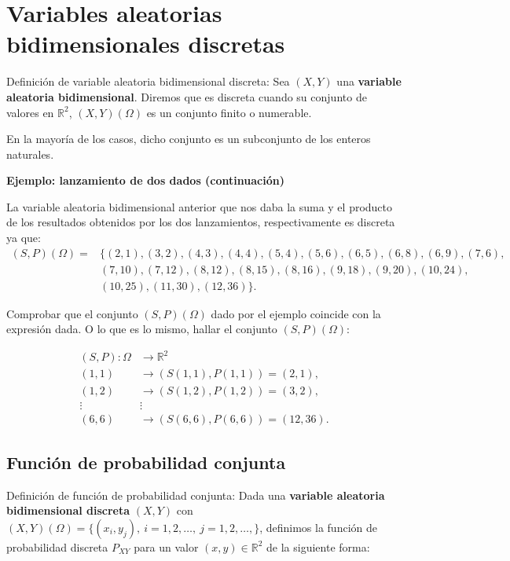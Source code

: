 \documentclass[
  letterpaper,
  DIV=11,
  numbers=noendperiod]{scrreprt}
\begin{document}
\hypertarget{variables-aleatorias-bidimensionales-discretas}{%
\section{Variables aleatorias bidimensionales
discretas}\label{variables-aleatorias-bidimensionales-discretas}}

Definición de variable aleatoria bidimensional discreta: Sea \((X,Y)\)
una \textbf{variable aleatoria bidimensional}. Diremos que es discreta
cuando su conjunto de valores en \(\mathbb{R}^2\), \((X,Y)(\Omega)\) es
un conjunto finito o numerable.

En la mayoría de los casos, dicho conjunto es un subconjunto de los
enteros naturales.

\textbf{Ejemplo: lanzamiento de dos dados (continuación)}

La variable aleatoria bidimensional anterior que nos daba la suma y el
producto de los resultados obtenidos por los dos lanzamientos,
respectivamente es discreta ya que: \[
\begin{array}{rl}
(S,P)(\Omega) =&\{(2,1),(3,2),(4,3),(4,4),(5,4),(5,6),(6,5),(6,8),(6,9),(7,6),\\ & 
(7,10),(7,12),(8,12), (8,15),(8,16),(9,18),(9,20),(10,24),\\ & (10,25),(11,30), (12,36)\}.
\end{array}
\]

Comprobar que el conjunto \((S,P)(\Omega)\) dado por el ejemplo coincide
con la expresión dada. O lo que es lo mismo, hallar el conjunto
\((S,P)(\Omega)\):

\[
\begin{array}{rl}
(S,P): \Omega & \longrightarrow \mathbb{R}^2\\
(1,1) & \longrightarrow (S(1,1),P(1,1))=(2,1),\\
(1,2) & \longrightarrow (S(1,2),P(1,2))=(3,2),\\
\vdots & \vdots \\
(6,6) & \longrightarrow (S(6,6),P(6,6))=(12,36).
\end{array}
\]

\hypertarget{funciuxf3n-de-probabilidad-conjunta}{%
\subsection{Función de probabilidad
conjunta}\label{funciuxf3n-de-probabilidad-conjunta}}

Definición de función de probabilidad conjunta: Dada una
\textbf{variable aleatoria bidimensional discreta} \((X,Y)\) con
\((X,Y)(\Omega)=\{(x_i,y_j),\ i=1,2,\ldots,\ j=1,2,\ldots,\}\),
definimos la función de probabilidad discreta \(P_{XY}\) para un valor
\((x,y)\in\mathbb{R}^2\) de la siguiente forma:
\end{document}
